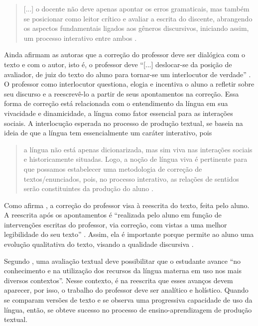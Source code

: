 \documentclass[portuguese]{textolivre}
\begin{document}
\begin{quote}
    [...] o docente não deve apenas apontar os erros gramaticais, mas também se posicionar como leitor crítico e avaliar a escrita do discente, abrangendo os aspectos fundamentais ligados aos gêneros discursivos, iniciando assim, um processo interativo entre ambos \cite[p. 97]{goncalves2023}.
\end{quote}

Ainda afirmam as autoras \cite{ruiz2015, conceicao2004} que a correção do professor deve ser dialógica com o texto e com o autor, isto é, o professor deve ``[...] deslocar-se da posição de avaliador, de juiz do texto do aluno para tornar-se um interlocutor de verdade'' \cite[p. 328]{conceicao2004}. O professor como interlocutor questiona, elogia e incentiva o aluno a refletir sobre seu discurso e a reescrevê-lo a partir de seus apontamentos na correção. Essa forma de correção está relacionada com o entendimento da língua em sua vivacidade e dinamicidade, a língua como fator essencial para as interações sociais. A interlocução esperada no processo de produção textual, se baseia na ideia de que a língua tem essencialmente um caráter interativo, pois

\begin{quote}
    a língua não está apenas dicionarizada, mas sim viva nas interações sociais e historicamente situadas. Logo, a noção de língua viva é pertinente para que possamos estabelecer uma metodologia de correção de textos/enunciados, pois, no processo interativo, as relações de sentidos serão constituintes da produção do aluno \cite[p. 96]{goncalves2023}.
\end{quote}

Como afirma \textcite{ruiz2015}, a correção do professor visa à reescrita do texto, feita pelo aluno. A reescrita após os apontamentos é ``realizada pelo aluno em função de intervenções escritas do professor, via correção, com vistas a uma melhor legibilidade do seu texto'' \cite[p. 25]{ruiz2015}. Assim, ela é importante porque permite ao aluno uma evolução qualitativa do texto, visando a qualidade discursiva \cite{conceicao2004}.

Segundo \textcite[p. 215]{fuzer2012bilhete}, uma avaliação textual deve possibilitar que o estudante avance ``no conhecimento e na utilização dos recursos da língua materna em uso nos mais diversos contextos''. Nesse contexto, é na reescrita que esses avanços devem aparecer, por isso, o trabalho do professor deve ser analítico e holístico. Quando se comparam versões de texto e se observa uma progressiva capacidade de uso da língua, então, se obteve sucesso no processo de ensino-aprendizagem de produção textual.
\end{document}
